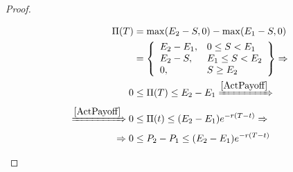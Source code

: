\begin{proof}
\begin{enumerate}
        \begin{align*}
            \Pi(T) &= \max(E_2 - S,0) - \max(E_1 - S,0) \\
            &= \left\{
            \begin{array}{ll}
              E_2 - E_1,       & 0 \leq S < E_1 \\
              E_2-S,        & E_1 \leq S < E_2 \\
              0,        & S \geq E_2
            \end{array}
            \right\} \Rightarrow \\
            0 &\leq \Pi(T) \leq E_2-E_1 \xRightarrow{\ref{ActPayoff}}\\
            \xRightarrow{\ref{ActPayoff}} 0 &\leq \Pi(t) \leq (E_2-E_1)e^{-r(T-t)} \Rightarrow \\
            \Rightarrow 0 &\leq P_2-P_1 \leq (E_2-E_1)e^{-r(T-t)}
        \end{align*}
    \end{enumerate}
\end{proof}





